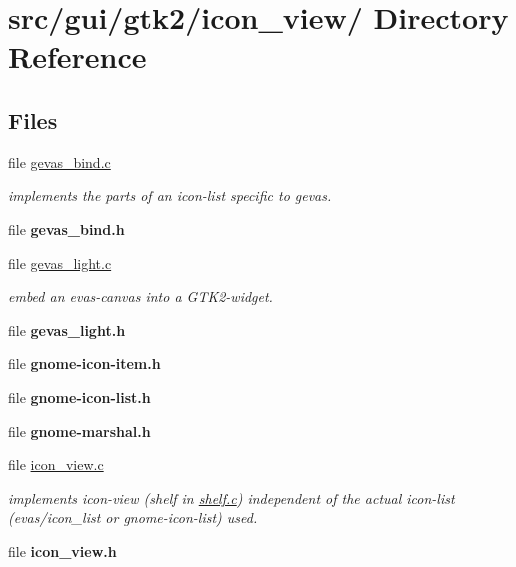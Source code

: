 \hypertarget{dir_000026}{
\section{src/gui/gtk2/icon\_\-view/ Directory Reference}
\label{dir_000026}
}
\subsection*{Files}
\begin{CompactItemize}
\item 
file \hyperlink{gevas__bind_8c}{gevas\_\-bind.c}
\begin{CompactList}\small\item\em implements the parts of an icon-list specific to gevas. \item\end{CompactList}

\item 
file {\bf gevas\_\-bind.h}
\item 
file \hyperlink{gevas__light_8c}{gevas\_\-light.c}
\begin{CompactList}\small\item\em embed an evas-canvas into a GTK2-widget. \item\end{CompactList}

\item 
file {\bf gevas\_\-light.h}
\item 
file {\bf gnome-icon-item.h}
\item 
file {\bf gnome-icon-list.h}
\item 
file {\bf gnome-marshal.h}
\item 
file \hyperlink{icon__view_8c}{icon\_\-view.c}
\begin{CompactList}\small\item\em implements icon-view (shelf in \hyperlink{shelf_8c}{shelf.c}) independent of the actual icon-list (evas/icon\_\-list or gnome-icon-list) used. \item\end{CompactList}

\item 
file {\bf icon\_\-view.h}
\end{CompactItemize}
